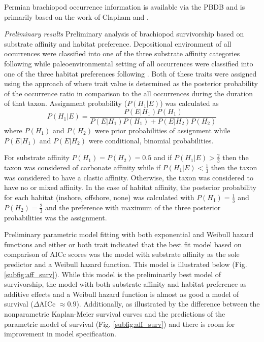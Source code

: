 \documentclass[12pt,letterpaper]{article}
\begin{document}
Permian brachiopod occurrence information is available via the PBDB and is primarily based on the work of Clapham \citep{Clapham2006,Clapham2008a,Clapham2007a,Clapham2012,Clapham2007} and \citet{Waterhouse1987}.


\textit{Preliminary results}
Preliminary analysis of brachiopod survivorship based on substrate affinity and habitat preference. Depositional environment of all occurrences were classified into one of the three substrate affinity categories following \citet{Foote2006} while paleoenvironmental setting of all occurrences were classified into one of the three habitat preferences following \citet{Kiessling2007}. Both of these traits were assigned using the approach of \citet{Simpson2009} where trait value is determined as the posterior probability of the occurrence ratio in comparison to the all occurrences during the duration of that taxon. Assignment probability (\(P(H_{1}|E)\)) was calculated as
\begin{equation}
  P(H_{1}|E) = \frac{P(E|H_{1})P(H_{1})}{P(E|H_{1})P(H_{1}) + P(E|H_{2})P(H_{2})}
\end{equation}
where \(P(H_{1})\) and \(P(H_{2})\) were prior probabilities of assignment while \(P(E|H_{1})\) and \(P(E|H_{2})\) were conditional, binomial probabilities. 

For substrate affinity \(P(H_{1}) = P(H_{2}) = 0.5\) and if \(P(H_{1}|E) > \frac{2}{3}\) then the taxon was considered of carbonate affinity while if \(P(H_{1}|E) < \frac{1}{3}\) then the taxon was considered to have a clastic affinity. Otherwise, the taxon was considered to have no or mixed affinity. In the case of habitat affinity, the posterior probability for each habitat (inshore, offshore, none) was calculated with \(P(H_{1}) = \frac{1}{3}\) and \(P(H_{2}) = \frac{2}{3}\) and the preference with maximum of the three posterior probabilities was the assignment.

Preliminary parametric model fitting with both exponential and Weibull hazard functions and either or both trait indicated that the best fit model based on comparison of AICc scores \citep{Hurvich1989,Akaike1974,Burnham2002a} was the model with substrate affinity as the sole predictor and a Weibull hazard function. This model is illustrated below (Fig. \ref{subfig:aff_surv}). While this model is the preliminarily best model of survivorship, the model with both substrate affinity and habitat preference as additive effects and a Weibull hazard function is almost as good a model of survival (\(\Delta\)AICc \(\approx 0.9\)). Additionally, as illustrated by the difference between the nonparametric Kaplan-Meier survival curves and the predictions of the parametric model of survival (Fig. \ref{subfig:aff_surv}) and there is room for improvement in model specification. 
\end{document}
